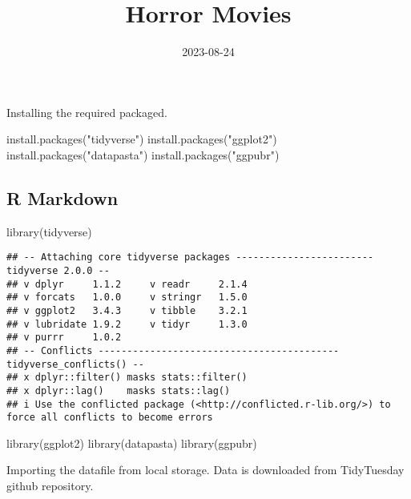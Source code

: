 \documentclass[
]{article}
\title{Horror Movies}
\author{}
\date{\vspace{-2.5em}2023-08-24}
\newenvironment{Shaded}{\begin{snugshade}}{\end{snugshade}}
\newcommand{\FunctionTok}[1]{\textcolor[rgb]{0.00,0.00,0.00}{#1}}
\newcommand{\NormalTok}[1]{#1}
\newcommand{\StringTok}[1]{\textcolor[rgb]{0.31,0.60,0.02}{#1}}
\begin{document}
\maketitle

Installing the required packaged.

\begin{Shaded}
\begin{Highlighting}[]
\FunctionTok{install.packages}\NormalTok{(}\StringTok{"tidyverse"}\NormalTok{)}
\FunctionTok{install.packages}\NormalTok{(}\StringTok{"ggplot2"}\NormalTok{)}
\FunctionTok{install.packages}\NormalTok{(}\StringTok{"datapasta"}\NormalTok{)}
\FunctionTok{install.packages}\NormalTok{(}\StringTok{"ggpubr"}\NormalTok{)}
\end{Highlighting}
\end{Shaded}

\hypertarget{r-markdown}{%
\subsection{R Markdown}\label{r-markdown}}

\begin{Shaded}
\begin{Highlighting}[]
\FunctionTok{library}\NormalTok{(tidyverse)}
\end{Highlighting}
\end{Shaded}

\begin{verbatim}
## -- Attaching core tidyverse packages ------------------------ tidyverse 2.0.0 --
## v dplyr     1.1.2     v readr     2.1.4
## v forcats   1.0.0     v stringr   1.5.0
## v ggplot2   3.4.3     v tibble    3.2.1
## v lubridate 1.9.2     v tidyr     1.3.0
## v purrr     1.0.2     
## -- Conflicts ------------------------------------------ tidyverse_conflicts() --
## x dplyr::filter() masks stats::filter()
## x dplyr::lag()    masks stats::lag()
## i Use the conflicted package (<http://conflicted.r-lib.org/>) to force all conflicts to become errors
\end{verbatim}

\begin{Shaded}
\begin{Highlighting}[]
\FunctionTok{library}\NormalTok{(ggplot2)}
\FunctionTok{library}\NormalTok{(datapasta)}
\FunctionTok{library}\NormalTok{(ggpubr)}
\end{Highlighting}
\end{Shaded}

Importing the datafile from local storage. Data is downloaded from
TidyTuesday github repository.
\end{document}
